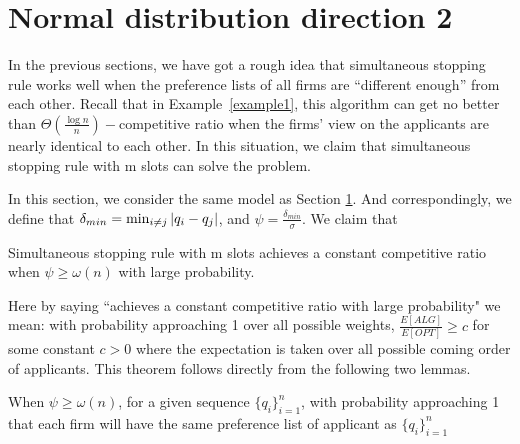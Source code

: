 \section{Normal distribution direction 2}


In the previous sections, we have got a rough idea that simultaneous stopping rule works well when the preference lists of all firms are ``different enough'' from each other.
Recall that in Example~\ref{example1}, this algorithm can get no better than $\Theta(\frac{\log n}{n})-$competitive ratio when the firms' view on the applicants are nearly identical to each other.
In this situation, we claim that simultaneous stopping rule with m slots can solve the problem.

In this section, we consider the same model as Section \ref{}.
And correspondingly, we
define that $\delta_{min} = \min_{i \neq j} \left\vert q_i - q_j\right\vert$, and
$\psi = \frac{\delta_{min}}{\sigma}$.
We claim that


\begin{theorem} \label{northm2}
    Simultaneous stopping rule with m slots achieves a constant competitive
    ratio when $\psi \ge \omega(n)$ with large probability.
\end{theorem}

Here by saying ``achieves a constant competitive ratio with large probability" we mean:
with probability approaching 1 over all possible weights, 
$\frac{E[ALG]}{E[OPT]} \ge c$ for some constant $c > 0$ where 
the expectation is taken over all possible coming order of applicants.
This theorem follows directly from the following two lemmas.

\begin{lemma} \label{orderlem}
    When $\psi \ge \omega(n)$, for a given sequence $\{q_i\}_{i=1}^{n}$, with probability approaching 1 that
    each firm will have the same preference list of applicant as $\{q_i\}_{i=1}^{n}$

\end{lemma}

